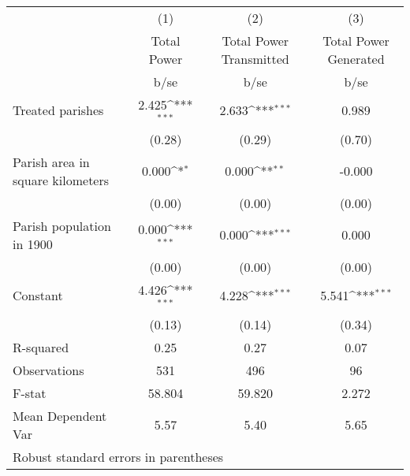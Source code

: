 {
\def\sym#1{\ifmmode^{#1}\else\(^{#1}\)\fi}
\begin{tabular}{l*{3}{c}}
\hline\hline
                    &\multicolumn{1}{c}{(1)}         &\multicolumn{1}{c}{(2)}         &\multicolumn{1}{c}{(3)}         \\
                    & Total Power         &Total Power Transmitted         &Total Power Generated         \\
                    &        b/se         &        b/se         &        b/se         \\
\hline
Treated parishes    &       2.425\sym{***}&       2.633\sym{***}&       0.989         \\
                    &      (0.28)         &      (0.29)         &      (0.70)         \\
Parish area in square kilometers&       0.000\sym{*}  &       0.000\sym{**} &      -0.000         \\
                    &      (0.00)         &      (0.00)         &      (0.00)         \\
Parish population in 1900&       0.000\sym{***}&       0.000\sym{***}&       0.000         \\
                    &      (0.00)         &      (0.00)         &      (0.00)         \\
Constant            &       4.426\sym{***}&       4.228\sym{***}&       5.541\sym{***}\\
                    &      (0.13)         &      (0.14)         &      (0.34)         \\
\hline
R-squared           &        0.25         &        0.27         &        0.07         \\
Observations        &         531         &         496         &          96         \\
F-stat              &      58.804         &      59.820         &       2.272         \\
Mean Dependent Var  &        5.57         &        5.40         &        5.65         \\
\hline\hline
\multicolumn{4}{l}{\footnotesize Robust standard errors in parentheses}\\
\end{tabular}
}
